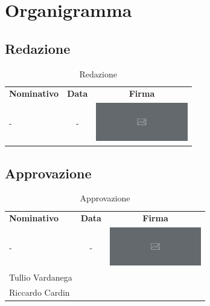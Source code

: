\documentclass[../piano-di-progetto.tex]{subfiles}
\begin{document}
  \section{Organigramma}

  \subsection{Redazione}

  \begin{table}[H]
    \centering
    \begin{tabular}{lcc}
      \rowcolor{lightgray}

      \textbf{Nominativo}  & \textbf{Data} & \textbf{Firma}  \\
            - & - & \includegraphics[width=4cm]{img/ph.png}
    \end{tabular}
    \caption{Redazione}
  \end{table}

  \subsection{Approvazione}

  \begin{table}[H]
    \centering
    \begin{tabular}{lcc}
      \rowcolor{lightgray}
      \textbf{Nominativo}  & \textbf{Data} & \textbf{Firma}  \\
      - & - & \includegraphics[width=4cm]{img/ph.png} \\
      Tullio Vardanega & &    \\
      Riccardo Cardin & &
    \end{tabular}
    \caption{Approvazione}
  \end{table}

  
  \begin{table}[H]
    \centering
    \begin{tabular}{lcc}

    \end{tabular}
  \end{table}
\end{document}
